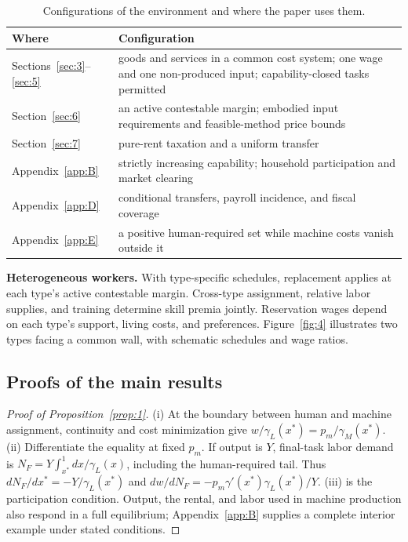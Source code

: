 \documentclass[12pt]{article}
\theoremstyle{plain}
\begin{document}
\begin{table}[htbp]
\centering
\caption{Configurations of the environment and where the paper uses them.}
\label{tab:A.1}
{\small
\begin{tabular}{l p{8.6cm}}
\toprule
Where & Configuration \\
\midrule
Sections~\ref{sec:3}--\ref{sec:5}
& \raggedright goods and services in a common cost system; one wage and one non-produced input; capability-closed tasks permitted \tabularnewline
Section~\ref{sec:6}
& \raggedright an active contestable margin; embodied input requirements and feasible-method price bounds \tabularnewline
Section~\ref{sec:7}
& \raggedright pure-rent taxation and a uniform transfer \tabularnewline
Appendix~\ref{app:B}
& \raggedright strictly increasing capability; household participation and market clearing \tabularnewline
Appendix~\ref{app:D}
& \raggedright conditional transfers, payroll incidence, and fiscal coverage \tabularnewline
Appendix~\ref{app:E}
& \raggedright a positive human-required set while machine costs vanish outside it \tabularnewline
\bottomrule
\end{tabular}
}
\end{table}

\textbf{Heterogeneous workers.} With type-specific schedules, replacement applies at each type's active contestable margin. Cross-type assignment, relative labor supplies, and training determine skill premia jointly. Reservation wages depend on each type's support, living costs, and preferences. Figure~\ref{fig:4} illustrates two types facing a common wall, with schematic schedules and wage ratios.

\subsection{Proofs of the main results}\label{app:A.2}

\begin{proof}[Proof of Proposition~\ref{prop:1}]
(i) At the boundary between human and machine assignment, continuity and cost minimization give $w/\gamma_L(x^*)=p_m/\gamma_M(x^*)$. (ii) Differentiate the equality at fixed $p_m$. If output is $Y$, final-task labor demand is $N_F=Y\int_{x^*}^1dx/\gamma_L(x)$, including the human-required tail. Thus $dN_F/dx^*=-Y/\gamma_L(x^*)$ and $dw/dN_F=-p_m\gamma'(x^*)\gamma_L(x^*)/Y$. (iii) is the participation condition. Output, the rental, and labor used in machine production also respond in a full equilibrium; Appendix~\ref{app:B} supplies a complete interior example under stated conditions.
\end{proof}
\end{document}
